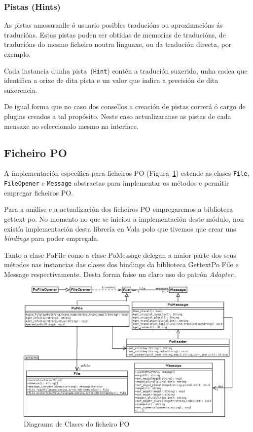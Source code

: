 \subsubsection{Pistas (Hints)}
As pistas amosaranlle ó usuario posibles traducións ou aproximacións ás traducións. Estas pistas poden ser obtidas de memorias de traducións, de traducións do mesmo ficheiro noutra linguaxe, ou da tradución directa, por exemplo.

Cada instancia dunha pista~(\lstinline{Hint}) contén a tradución suxerida, unha cadea que identifica a orixe de dita pista e un valor que indica a precisión de dita suxerencia.

De igual forma que no caso dos consellos a creación de pistas correrá ó cargo de plugins creados a tal propósito. Neste caso actualizaranse as pistas de cada mensaxe ao seleccionalo mesmo na interface.

\subsection{Ficheiro PO}
A implementación específica para ficheiros PO (Figura~\ref{fig:dia_class:pofile}) estende as clases \lstinline{File}, \lstinline{FileOpener} e \lstinline{Message} abstractas para implementar os métodos e permitir empregar ficheiros PO.

Para a análise e a actualización dos ficheiros PO empregaremos a biblioteca gettext-po. No momento no que se iniciou a implementación deste módulo, non existía implementación desta librería en Vala polo que tivemos que crear uns \emph{bindings} para poder empregala.

Tanto a clase PoFile como a clase PoMessage delegan a maior parte dos seus métodos nas instancias das clases dos bindings da biblioteca GettextPo File e Message respectivamente. Desta forma faise un claro uso do patrón \emph{Adapter}\cite{book:gang4pat}.

\begin{figure}[h!]
    \centering
    \includegraphics[width=\textwidth]{img/pofile.png}
    \caption{Diagrama de Clases do ficheiro PO}
    \label{fig:dia_class:pofile}
\end{figure}

